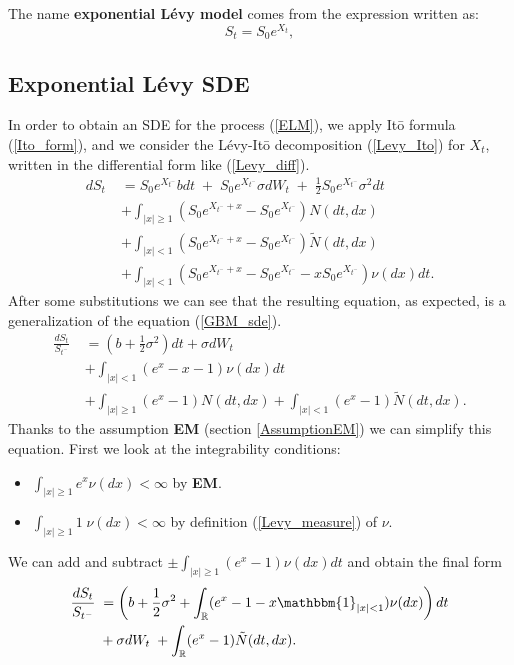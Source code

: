 The name \textbf{exponential Lévy model} comes from the expression written as: 
\begin{equation}\label{ELM}
 S_t = S_0 e^{X_t} ,
\end{equation}

\subsection{Exponential Lévy SDE}

In order to obtain an SDE for the process (\ref{ELM}), we apply It\={o} formula (\ref{Ito_form}), and we consider 
the Lévy-It\={o} decomposition (\ref{Levy_Ito}) for $X_t$, written in the differential form like (\ref{Levy_diff}).
\begin{align*}
 d S_t \; &= S_0 e^{X_{t^-}} b dt \; + \; S_0 e^{X_{t^-}} \sigma dW_t \; + \; \frac{1}{2}S_0 e^{X_{t^-}}\sigma^2 dt \\ \nonumber
          &+ \int_{|x|\geq 1} (S_0 e^{X_{t^-}+x} - S_0 e^{X_{t^-}}) N(dt,dx) \\ \nonumber
          &+ \int_{|x|< 1} (S_0 e^{X_{t^-}+x} - S_0 e^{X_{t^-}}) \tilde N(dt,dx) \\  \nonumber
          &+ \int_{|x|< 1} (S_0 e^{X_{t^-}+x} - S_0 e^{X_{t^-}} - x S_0 e^{X_{t^-}}) \nu(dx) dt. \nonumber
\end{align*}
After some substitutions we can see that the resulting equation, as expected, is a generalization of the equation (\ref{GBM_sde}).
\begin{align}
 \frac{d S_t}{S_{t^-}}  \; &= (b + \frac{1}{2}\sigma^2 ) dt + \sigma dW_t \\ \nonumber
                          &+ \int_{|x|< 1} ( e^{x} - x - 1) \nu(dx) dt \\ \nonumber
                          &+ \int_{|x|\geq 1} (e^{x} - 1) N(dt,dx) + \int_{|x|< 1} (e^{x} - 1) \tilde N(dt,dx). \nonumber
\end{align}
Thanks to the assumption \textbf{EM} (section \ref{AssumptionEM}) we can simplify this equation.
First we look at the integrability conditions:
\begin{itemize}
 \item $\int_{|x|\geq 1}  e^{x} \nu(dx) < \infty$ by \textbf{EM}.  
 \item $\int_{|x|\geq 1} 1\; \nu(dx) < \infty$ by definition (\ref{Levy_measure}) of $\nu$.
\end{itemize}
We can add and subtract $\pm \int_{|x|\geq 1} ( e^{x} - 1) \nu(dx) dt $ and obtain the final form
\begin{align} \label{exp_sde}
 \frac{d S_t}{S_{t^-}}  \; &= \left(b + \frac{1}{2}\sigma^2 + \int_{\R} ( e^{x} - 1 -x\mathbbm{1}_{|x|<1}) \nu(dx) \right) dt  \\ \nonumber
                          &+  \sigma dW_t \; + \int_{\R} (e^{x} - 1) \tilde N(dt,dx). \nonumber
\end{align}
